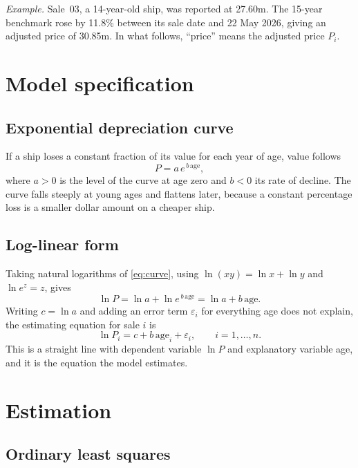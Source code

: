 \documentclass[11pt,a4paper]{article}
\newcommand{\usd}[1]{\text{US\$}#1}
\newcommand{\age}{\mathrm{age}}
\begin{document}
\emph{Example.} Sale~03, a 14-year-old ship, was reported at \usd{27.60}m. The 15-year benchmark rose by 11.8\% between its sale date and 22 May 2026, giving an adjusted price of \usd{30.85}m.
In what follows, ``price'' means the adjusted price $P_i$.

\section{Model specification}

\subsection{Exponential depreciation curve}

If a ship loses a constant fraction of its value for each year of age, value follows
\begin{equation}
\label{eq:curve}
P = a\,e^{\,b\,\age},
\end{equation}
where $a > 0$ is the level of the curve at age zero and $b < 0$ its rate of decline.
The curve falls steeply at young ages and flattens later, because a constant percentage loss is a smaller dollar amount on a cheaper ship.

\subsection{Log-linear form}

Taking natural logarithms of \eqref{eq:curve}, using $\ln(xy) = \ln x + \ln y$ and $\ln e^{z} = z$, gives
\[
\ln P = \ln a + \ln e^{\,b\,\age} = \ln a + b\,\age .
\]
Writing $c = \ln a$ and adding an error term $\varepsilon_i$ for everything age does not explain, the estimating equation for sale $i$ is
\begin{equation}
\label{eq:model}
\boxed{\;\ln P_i = c + b\,\age_i + \varepsilon_i, \qquad i = 1,\dots,n.\;}
\end{equation}
This is a straight line with dependent variable $\ln P$ and explanatory variable age, and it is the equation the model estimates.

\section{Estimation}

\subsection{Ordinary least squares}
\end{document}
